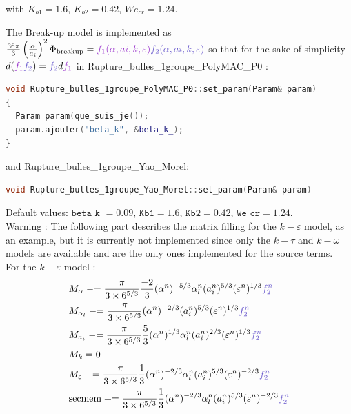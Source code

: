 with $K_{b1} = 1.6$, $K_{b2} = 0.42$, $We_{cr} = 1.24$.

The {\colorbox{codebackground}{\color{codekeyword3}  Break-up}} model is implemented as $\frac{36\pi}{3}\parent{\frac{\alpha}{a_i}}^2\Phi_{\text{breakup}}={\color{mydarkorchid}f_1(\alpha,ai,k,\varepsilon)}{\color{myslateblue} f_2(\alpha,ai,k,\varepsilon)}$ so that for the sake of simplicity $d({\color{mydarkorchid}f_1}{\color{myslateblue} f_2})={\color{myslateblue} f_2}d{\color{mydarkorchid} f_1}$  in {\color{mydarkorchid} Rupture_bulles_1groupe_PolyMAC_P0} :
\begin{lstlisting}[language=c++]
void Rupture_bulles_1groupe_PolyMAC_P0::set_param(Param& param)
{
  Param param(que_suis_je());
  param.ajouter("beta_k", &beta_k_);
}
\end{lstlisting}
and {\color{myslateblue} Rupture_bulles_1groupe_Yao_Morel}:
\begin{lstlisting}[language=c++]
void Rupture_bulles_1groupe_Yao_Morel::set_param(Param& param)
\end{lstlisting}
Default values: $\texttt{beta\_k\_} = 0.09$, $\texttt{Kb1} = 1.6$, $\texttt{Kb2} = 0.42$, $\texttt{We\_cr} = 1.24$.\\
{\color{red} Warning} : The following part describes the matrix filling for the $k-\varepsilon$ model, as an example, but it is currently not implemented since only the $k-\tau$ and $k-\omega$ models are available and are the only ones implemented for the source terms.\\
For the $k-\varepsilon$ model :
\begin{align}
    &M_{\alpha} \minuseq \frac{\pi}{3\times 6^{5/3}}\frac{-2}{3}(\alpha^n)^{-5/3}\alpha_l^n(a_i^n)^{5/3}(\varepsilon^n)^{1/3} {\color{myslateblue} f_2^n}\\
    &M_{\alpha_l} \minuseq \frac{\pi}{3\times 6^{5/3}}(\alpha^n)^{-2/3}(a_i^n)^{5/3}(\varepsilon^n)^{1/3} {\color{myslateblue} f_2^n}\\
    &M_{a_i} \minuseq \frac{\pi}{3\times 6^{5/3}}\frac{5}{3}(\alpha^n)^{1/3}\alpha_l^n(a_i^n)^{2/3}(\varepsilon^n)^{1/3} {\color{myslateblue} f_2^n}\\
    &M_{k}=0\\
    &M_{\varepsilon} \minuseq \frac{\pi}{3\times 6^{5/3}}\frac{1}{3}(\alpha^n)^{-2/3}\alpha_l^n(a_i^n)^{5/3}(\varepsilon^n)^{-2/3} {\color{myslateblue} f_2^n}\\
    &\text{secmem}  \pluseq  \frac{\pi}{3\times 6^{5/3}}\frac{1}{3}(\alpha^n)^{-2/3}\alpha_l^n(a_i^n)^{5/3}(\varepsilon^n)^{-2/3} {\color{myslateblue} f_2^n}\\
\end{align}
